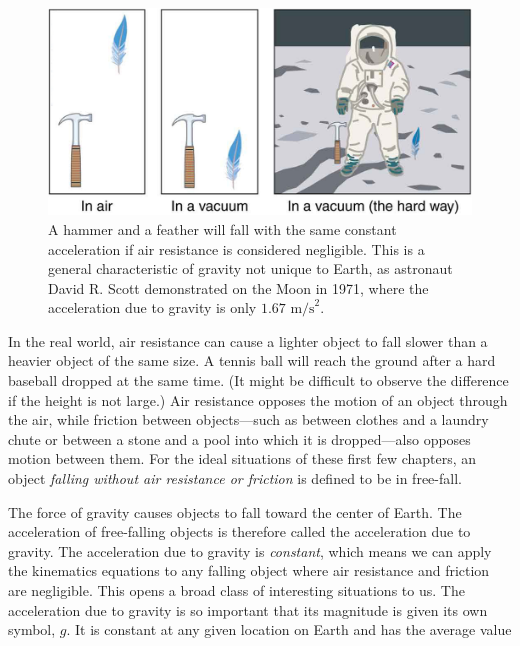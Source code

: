 \documentclass[
]{book}
\begin{document}
\begin{figure}
\hypertarget{import-auto-id4126662}{%
\centering
\includegraphics{images/Figure_02_07_00a.jpg}
\caption{A hammer and a feather will fall with the same constant acceleration
if air resistance is considered negligible. This is a general
characteristic of gravity not unique to Earth, as astronaut David R.
Scott demonstrated on the Moon in 1971, where the acceleration due to
gravity is only
\({1\text{.}\text{67\ m/s}^{2}}{}\).}\label{import-auto-id4126662}
}
\end{figure}

In the real world, air resistance can cause a lighter object to fall
slower than a heavier object of the same size. A tennis ball will reach
the ground after a hard baseball dropped at the same time. (It might be
difficult to observe the difference if the height is not large.) Air
resistance opposes the motion of an object through the air, while
friction between objects---such as between clothes and a laundry chute
or between a stone and a pool into which it is dropped---also opposes
motion between them. For the ideal situations of these first few
chapters, an object \emph{falling without air resistance or friction} is
defined to be in \protect\hypertarget{import-auto-id1714641}{}{free-fall}.

The force of gravity causes objects to fall toward the center of Earth.
The acceleration of free-falling objects is therefore called the
\protect\hypertarget{import-auto-id1707599}{}{acceleration due to gravity}.
The acceleration due to gravity is \emph{constant}, which means we can apply
the kinematics equations to any falling object where air resistance and
friction are negligible. This opens a broad class of interesting
situations to us. The acceleration due to gravity is so important that
its magnitude is given its own symbol, \(g{}\). It is constant at any
given location on Earth and has the average value
\end{document}
